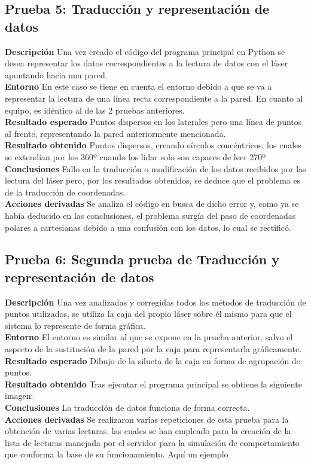 \subsection{Prueba 5: Traducción y representación de datos}
\textbf{Descripción} Una vez creado el código del programa principal en Python se desea representar los datos correspondientes a la lectura de datos con el láser apuntando hacia una pared. \\
\textbf{Entorno} En este caso se tiene en cuenta el entorno debido a que se va a representar la lectura de una línea recta correspondiente a la pared. En cuanto al equipo, es idéntico al de las 2 pruebas anteriores.\\
\textbf{Resultado esperado} Puntos dispersos en los laterales pero una línea de puntos al frente, representando la pared anteriormente mencionada.\\
\textbf{Resultado obtenido} Puntos dispersos, creando círculos concéntricos, los cuales se extendían por los 360º cuando los lidar solo son capaces de leer 270º\\
\textbf{Conclusiones} Fallo en la traducción o modificación de los datos recibidos por las lectura del láser pero, por los resultados obtenidos, se deduce que el problema es de la traducción de coordenadas.\\
\textbf{Acciones derivadas}  Se analiza el código en busca de dicho error y, como ya se había deducido en las conclusiones, el problema surgía del paso de coordenadas polares a cartesianas debido a una confusión con los datos, lo cual se rectificó.

\subsection{Prueba 6: Segunda prueba de Traducción y representación de datos}
\textbf{Descripción} Una vez analizadas y corregidas todos los métodos de traducción de puntos utilizados, se utiliza la caja del propio láser sobre él mismo para que el sistema lo represente de forma gráfica.\\
\textbf{Entorno} El entorno es similar al que se expone en la prueba anterior, salvo el aspecto de la sustitución de la pared por la caja para representarla gráficamente.\\
\textbf{Resultado esperado} Dibujo de la silueta de la caja en forma de agrupación de puntos.\\
\textbf{Resultado obtenido} Tras ejecutar el programa principal se obtiene la siguiente imagen:\\
\textbf{Conclusiones} La traducción de datos funciona de forma correcta.\\
\textbf{Acciones derivadas}  Se realizaron varias repeticiones de esta prueba para la obtención de varias lecturas, las cuales se han empleado para la creación de la lista de lecturas manejada por el servidor para la simulación de comportamiento que conforma la base de su funcionamiento. Aquí un ejemplo
